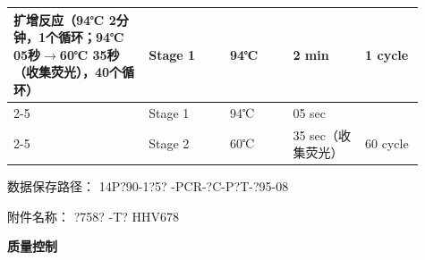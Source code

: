 \documentclass[UTF8,10pt,a4paper,fontset=fandol]{ctexart}
\newcommand{\fieldvalue}[1]{#1}
\newcommand{\handwritten}[1]{#1}
\begin{document}
\vspace{0.5em}

\begin{tabular}{|p{0.30\linewidth}|p{0.18\linewidth}|p{0.14\linewidth}|p{0.16\linewidth}|p{0.13\linewidth}|}
\hline
扩增反应（94℃ 2分钟，1个循环；94℃ 05秒$\rightarrow$60℃ 35秒（收集荧光），40个循环） &
Stage 1 &
\fieldvalue{\handwritten{94}}℃ &
\fieldvalue{\handwritten{2}} min &
\fieldvalue{\handwritten{1}} cycle \\ \cline{2-5}
&
Stage 1 &
\fieldvalue{\handwritten{94}}℃ &
\fieldvalue{\handwritten{05}} sec &
\\ \cline{2-5}
&
Stage 2 &
\fieldvalue{\handwritten{60}}℃ &
\fieldvalue{\handwritten{35}} sec（收集荧光）&
\fieldvalue{\handwritten{60}} cycle \\ \hline
\end{tabular}

\vspace{0.5em}

\noindent
数据保存路径：
\fieldvalue{\handwritten{14P?90-1?5? -PCR-?C-P?T-?95-08}}

\noindent
附件名称：
\fieldvalue{\handwritten{?758? -T? HHV678}}

\begin{center}
\textbf{质量控制}
\end{center}
\end{document}
